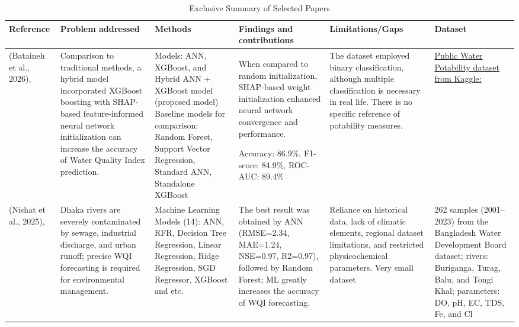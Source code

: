 \documentclass[conference]{IEEEtran}
\begin{document}
\begin{table}[htb!]
\centering
\scriptsize
\renewcommand{\arraystretch}{1.5}
\caption{Exclusive Summary of Selected Papers}
\label{tab:lit-review}

\begin{tabular} [htb]{|p{1.6cm}|p{3.1cm}|p{2.7cm}|p{3.1cm}|p{2.5cm}|p{2.6cm}|}
\hline
\textbf{Reference} & \textbf{Problem addressed} & \textbf{Methods} & \textbf{Findings and contributions} & \textbf{Limitations/Gaps} & \textbf{Dataset} \\
\hline

(Bataineh et al., 2026)\cite{al2026hybrid},\newline [Q1, IEEE] &
Comparison to traditional methods, a hybrid model incorporated XGBoost boosting with SHAP-based feature-informed neural network initialization can increase the accuracy of Water Quality Index prediction. &

Models: ANN, XGBoost, and Hybrid ANN + XGBoost model (proposed model)
Baseline models for comparison: Random Forest, Support Vector Regression, Standard ANN, Standalone XGBoost
 &
When compared to random initialization, SHAP-based weight initialization enhanced neural network convergence and performance.

Accuracy: 86.9\%, F1-score: 84.9\%, ROC-AUC: 89.4\% &
The dataset employed binary classification, although multiple classification is necessary in real life. There is no specific reference of potability measures.&

\href{https://www.kaggle.com/datasets/uom190346a/water-quality-and-potability}{Public Water Potability dataset from Kaggle: }\\
\hline


(Nishat et al., 2025)\cite{nishat2025comparative},\newline [Q1, Springer] & Dhaka rivers are severely contaminated by sewage, industrial discharge, and urban runoff; precise WQI forecasting is required for environmental management. & Machine Learning Models (14): ANN, RFR, Decision Tree Regression, Linear Regression, Ridge Regression, SGD Regressor, XGBoost and etc. & The best result was obtained by ANN (RMSE=2.34, MAE=1.24, NSE=0.97, R2=0.97), followed by Random Forest; ML greatly increases the accuracy of WQI forecasting. & Reliance on historical data, lack of climatic elements, regional dataset limitations, and restricted physicochemical parameters. Very small dataset & 262 samples (2001–2023) from the Bangladesh Water Development Board dataset; rivers: Buriganga, Turag, Balu, and Tongi Khal; parameters: DO, pH, EC, TDS, Fe, and Cl \\


\end{tabular}
\end{table}
\end{document}
